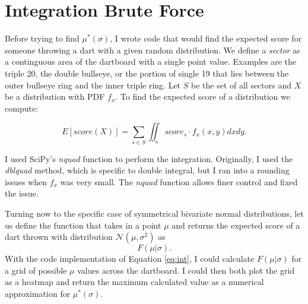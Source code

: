 \documentclass[]{article}
\begin{document}
\section{Integration Brute Force}
Before trying to find $\mu^*(\sigma)$, I wrote code that would find the expected score for someone throwing a dart with a given random distribution. We define a \textit{sector} as a continguous area of the dartboard with a single point value. Examples are the triple 20, the double bullseye, or the portion of single 19 that lies between the outer bullseye ring and the inner triple ring. Let $S$ be the set of all sectors and $X$ be a distribution with PDF $f_x$. To find the expected score of a distribution we compute:



\begin{equation}
	E[score(X)] = \sum_{s \in S} \iint_{s} score_s \cdot  f_x(x, y)  dxdy.
	\label{eq:int}
\end{equation}

I used SciPy's \textit{nquad} function to perform the integration. Originally, I used the \textit{dblquad} method, which is specific to double integral, but I ran into a rounding issues when $f_x$ was very small. The \textit{nquad} function allows finer control and fixed the issue. 

Turning now to the specific case of symmetrical bivariate normal distributions,  let us define the function that takes in a point $\mu$ and returns the expected score of a dart thrown with distribution $\mathcal{N}(\mu, \sigma^2)$ as
\begin{equation}
	F(\mu \vert \sigma).
	\label{eq:fmusig}
\end{equation}
With the code implementation of Equation \ref{eq:int}, I could calculate $F(\mu \vert \sigma)$ for a grid of possible $\mu$ values across the dartboard. I could then both plot the grid as a heatmap and return the maximum calculated value as a numerical approximation for $\mu^*(\sigma)$.
\end{document}

